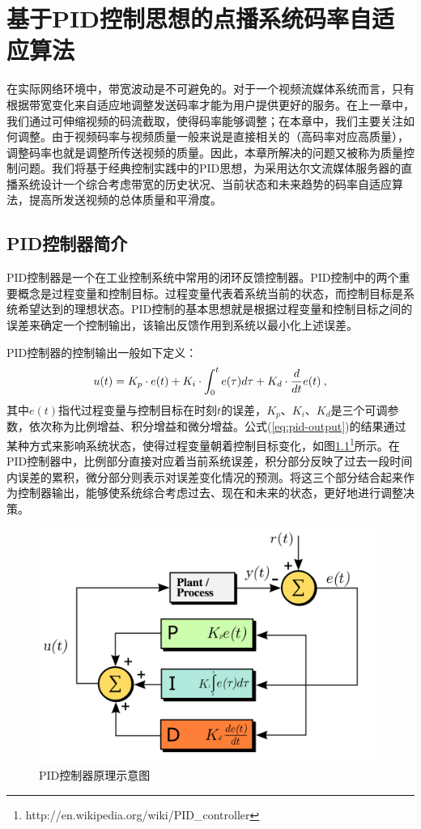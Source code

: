 \chapter{基于PID控制思想的点播系统码率自适应算法}

在实际网络环境中，带宽波动是不可避免的。对于一个视频流媒体系统而言，只有根据带宽变化来自适应地调整发送码率才能为用户提供更好的服务。在上一章中，我们通过可伸缩视频的码流截取，使得码率能够调整；在本章中，我们主要关注如何调整。由于视频码率与视频质量一般来说是直接相关的（高码率对应高质量），调整码率也就是调整所传送视频的质量。因此，本章所解决的问题又被称为质量控制问题。我们将基于经典控制实践中的PID思想，为采用达尔文流媒体服务器的直播系统设计一个综合考虑带宽的历史状况、当前状态和未来趋势的码率自适应算法，提高所发送视频的总体质量和平滑度。

\section{PID控制器简介}

PID控制器是一个在工业控制系统中常用的闭环反馈控制器。PID控制中的两个重要概念是过程变量和控制目标。过程变量代表着系统当前的状态，而控制目标是系统希望达到的理想状态。PID控制的基本思想就是根据过程变量和控制目标之间的误差来确定一个控制输出，该输出反馈作用到系统以最小化上述误差。

PID控制器的控制输出一般如下定义：
\begin{equation}
\vspace{10pt}
\label{eq:pid-output}
u(t) = {K_p} \cdot e(t) + {K_i} \cdot \int_0^t {e(\tau )d\tau }  + {K_d} \cdot \frac{d}{{dt}}e(t) \: ,
\end{equation}
其中$e(t)$指代过程变量与控制目标在时刻$t$的误差，$K_p$、$K_i$、$K_d$是三个可调参数，依次称为比例增益、积分增益和微分增益。公式(\ref{eq:pid-output})的结果通过某种方式来影响系统状态，使得过程变量朝着控制目标变化，如图\ref{fig:pid-controller}\footnote{http://en.wikipedia.org/wiki/PID\_controller}所示。在PID控制器中，比例部分直接对应着当前系统误差，积分部分反映了过去一段时间内误差的累积，微分部分则表示对误差变化情况的预测。将这三个部分结合起来作为控制器输出，能够使系统综合考虑过去、现在和未来的状态，更好地进行调整决策。

\begin{figure}[h]
	\centering
	\vspace{10pt}
	\vspace{10pt}
	\includegraphics[width = 0.7\linewidth]{figures/pid-controller.png}
	\vspace{10pt}
	\caption{PID控制器原理示意图\label{fig:pid-controller}}
\end{figure}

